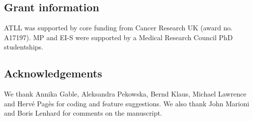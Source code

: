 \documentclass[10pt,a4paper,twocolumn]{article}
\begin{document}
\subsection*{Grant information}
ATLL was supported by core funding from Cancer Research UK (award no. A17197).
MP and EI-S were supported by a Medical Research Council PhD studentships.

\subsection*{Acknowledgements}
We thank Annika Gable, Aleksandra Pekowska, Bernd Klaus, Michael Lawrence and Herv\'e Pag\`es for coding and feature suggestions.
We also thank John Marioni and Boris Lenhard for comments on the manuscript.

\nocite{*}
{\small
}
\end{document}
